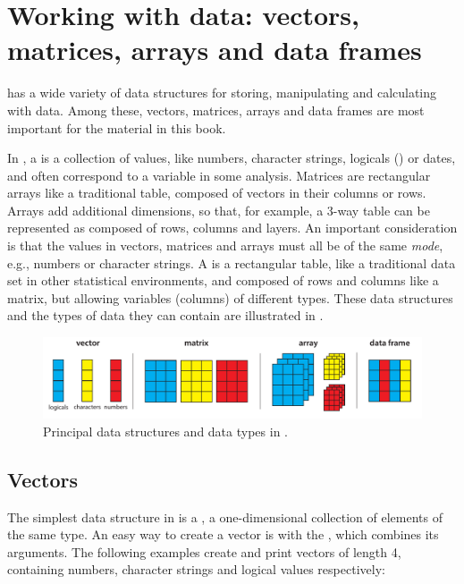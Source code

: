 \documentclass[11pt]{book}\usepackage[]{graphicx}\usepackage[]{color}
\begin{document}
\section{Working with \R data: vectors, matrices, arrays and data frames}\label{sec:Rdata}

\R has a wide variety of data structures for storing, manipulating and
calculating with data.  Among these, vectors, matrices, arrays and
data frames are most important for the material in this book. 

In \R, a  is a collection of values, like numbers, character strings, logicals () 
or dates, and often correspond to a variable in some analysis.
Matrices are rectangular arrays like a traditional table, composed of vectors in their columns
or rows.  
Arrays add additional dimensions, so that, for example, a 3-way table can be represented
as composed of rows, columns and layers.
An important consideration is that the values in vectors,
matrices and arrays must all be of the same \emph{mode}, e.g., numbers or character strings.
A  is a rectangular table, like a traditional data set in other
statistical environments, and composed of rows and columns like a matrix,
but allowing variables (columns) of different types. These data structures and the types of
data they can contain are illustrated in .

\begin{figure}
\includegraphics[width=\textwidth]{ch02/fig/datatypes2}
\caption[Principal data structures and data types in R]{Principal data structures and data types in \R.}
\label{fig:datatypes}
\end{figure}
\subsection{Vectors}
The simplest data structure in \R is a , a one-dimensional
collection of elements of the same type. An easy way to create a vector is with
the , which combines its arguments.  The following examples create
and print vectors of length 4, containing numbers, character strings and
logical values respectively:
\end{document}
